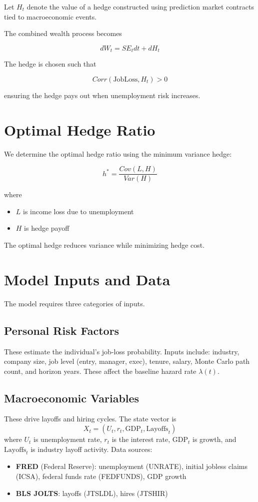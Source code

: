 \documentclass[11pt]{article}
\begin{document}
Let $H_t$ denote the value of a hedge constructed using prediction market 
contracts tied to macroeconomic events.

The combined wealth process becomes

\[
dW_t = S E_t dt + dH_t
\]

The hedge is chosen such that

\[
Corr(\text{JobLoss}, H_t) > 0
\]

ensuring the hedge pays out when unemployment risk increases.

\section{Optimal Hedge Ratio}

We determine the optimal hedge ratio using the minimum variance hedge:

\[
h^* =
\frac{Cov(L, H)}{Var(H)}
\]

where

\begin{itemize}
\item $L$ is income loss due to unemployment
\item $H$ is hedge payoff
\end{itemize}

The optimal hedge reduces variance while minimizing hedge cost.

\section{Model Inputs and Data}

The model requires three categories of inputs.

\subsection{Personal Risk Factors}

These estimate the individual's job-loss probability. Inputs include:
industry, company size, job level (entry, manager, exec), tenure, salary,
Monte Carlo path count, and horizon years. These affect the baseline hazard rate $\lambda(t)$.

\subsection{Macroeconomic Variables}

These drive layoffs and hiring cycles. The state vector is
\[
X_t = (U_t, r_t, \text{GDP}_t, \text{Layoffs}_t)
\]
where $U_t$ is unemployment rate, $r_t$ is the interest rate, $\text{GDP}_t$ 
is growth, and $\text{Layoffs}_t$ is industry layoff activity. Data sources:
\begin{itemize}
\item \textbf{FRED} (Federal Reserve): unemployment (UNRATE), initial jobless 
claims (ICSA), federal funds rate (FEDFUNDS), GDP growth
\item \textbf{BLS JOLTS}: layoffs (JTSLDL), hires (JTSHIR)
\end{itemize}
\end{document}
